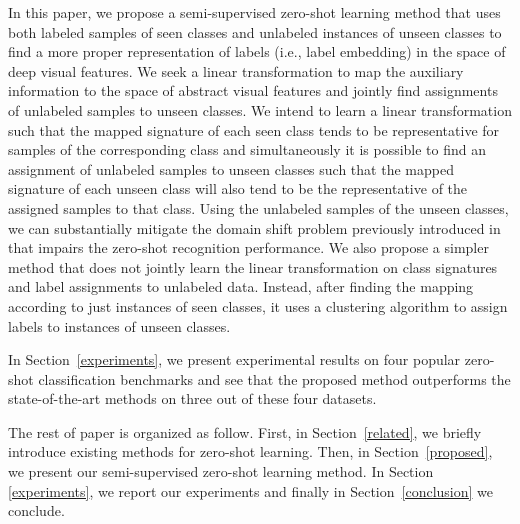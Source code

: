 \documentclass[10pt,twocolumn,letterpaper]{article}
\begin{document}
In this paper, we propose a semi-supervised zero-shot learning method that uses both labeled samples of seen classes and unlabeled instances of unseen classes to find a more proper representation of labels (i.e., label embedding) in the space of deep visual features. We seek a linear transformation to map the auxiliary information to the space of abstract visual features and jointly find assignments of unlabeled samples to unseen classes.
We intend to learn a linear transformation such that the mapped signature of each seen class tends to be representative for samples of the corresponding class and simultaneously it is possible to find an assignment of unlabeled samples to unseen classes such that the mapped signature of each unseen class will also tend to be the representative of the assigned samples to that class.
Using the unlabeled samples of the unseen classes, we can substantially mitigate the domain shift problem previously introduced in \cite{eccv14} that impairs the zero-shot recognition performance.
We also propose a simpler method that does not jointly learn the linear transformation on class signatures and label assignments to unlabeled data.
Instead, after finding the mapping according to just instances of seen classes, it uses a clustering algorithm to assign labels to instances of unseen classes. %

In Section~\ref{experiments}, we present experimental results on four popular zero-shot classification benchmarks and see that the proposed method outperforms the state-of-the-art methods on three out of these four datasets.

The rest of paper is organized as follow. First, in Section~\ref{related}, we briefly introduce existing methods for zero-shot learning.
Then, in Section~\ref{proposed}, we present our semi-supervised zero-shot learning method. In Section \ref{experiments}, we report our experiments and finally in Section~\ref{conclusion}
we conclude.
\end{document}
